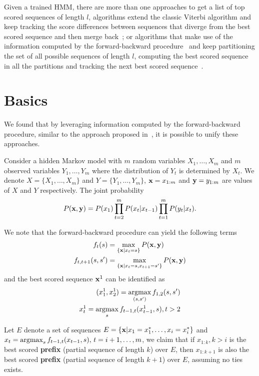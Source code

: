 Given a trained HMM, there are more than one approaches to get a list of top scored sequences of length $l$, 
\eg algorithms extend the classic Viterbi algorithm and keep tracking the score differences between sequences 
that diverge from the best scored sequence and then merge back~\cite{seshadri1994list,nill1995list};
or algorithms that make use of the information computed by the forward-backward procedure~\cite{rabiner1989tutorial}
and keep partitioning the set of all possible sequences of length $l$, computing the best scored sequence in all the partitions
and tracking the next best scored sequence~\cite{nilsson2001sequentially}.

\section{Basics}
\label{sec:basic}

We found that by leveraging information computed by the forward-backward procedure, similar to the approach proposed in~\cite{nilsson2001sequentially},
it is possible to unify these approaches.

Consider a hidden Markov model with $m$ random variables $X_1, \dots, X_m$ and $m$ observed variables $Y_1, \dots, Y_m$
where the distribution of $Y_t$ is determined by $X_t$.
We denote $X = \{X_1, \dots, X_m\}$ and $Y = \{Y_1, \dots, Y_m\}$, 
$\mathbf{x} = x_{1:m}$ and $\mathbf{y} = y_{1:m}$ are values of $X$ and $Y$ respectively.
The joint probability 
\begin{equation}
\label{eq:joint}
P(\mathbf{x}, \mathbf{y}) = P(x_1) \prod_{t=2}^m P(x_t |x_{t-1}) \prod_{t=1}^m P(y_t |x_t).
\end{equation}

We note that the forward-backward procedure can yield the following terms 
\begin{align}
\label{eq:basic}
f_t(s)           &= \max_{\{\mathbf{x}|x_t = s\}} P(\mathbf{x}, \mathbf{y}) \\
f_{t,t+1}(s, s') &= \max_{\{\mathbf{x}|x_t = s, x_{t+1} = s'\}} P(\mathbf{x}, \mathbf{y})
\end{align}
and the best scored sequence $\mathbf{x}^1$ can be identified as
\begin{align*}
(x_1^1, x_2^1) = \operatorname*{argmax}_{(s, s')} f_{1,2}(s, s') \\
x_t^1 = \operatorname*{argmax}_{s} f_{t-1, t}(x_{t-1}^1, s), t > 2
\end{align*}

\begin{lemma}
\label{lemma1}
Let $E$ denote a set of sequences $E = \{\mathbf{x} |x_1 = x_1^*, \dots, x_i = x_i^*\}$ and
$x_t = \operatorname*{argmax}_{s} f_{t-1, t}(x_{t-1}, s), \, t = i+1,\dots,m$, 
we claim that if $x_{1:k}, k > i$ is the best scored \textbf{prefix} (partial sequence of length $k$) over $E$, 
then $x_{1:k+1}$ is also the best scored \textbf{prefix} (partial sequence of length $k+1$) over $E$,
assuming no ties exists.
\end{lemma}

